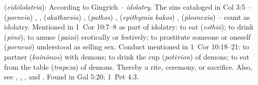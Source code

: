 \item[Idolatry,]

(\textit{eidōlolatria}):
According to Gingrich -- \emph{idolatry}. The sins cataloged in Col 3:5 --  (\emph{porneia}) , , (\emph{akatharsia}) ,  (\emph{pathos}) ,  (\emph{epithymia kakos}) ,  (\emph{pleonexia})  -- count as idolatry. Mentioned in 1~Cor 10:7--8 as part of idolatry: to eat  (\emph{esthiō}); to drink  (\emph{pinō}); to amuse  (\emph{paizō}) erotically or festively; to prostitute someone or oneself  (\emph{porneuō}) understood as selling sex. Conduct mentioned in 1~Cor 10:18--21: to partner  (\emph{koinōnos}) with demons; to drink the cup  (\emph{potērion}) of demons; to eat from the table  (\emph{trapeza}) of demons. Thereby a rite, ceremony, or sacrifice. Also, see  , , , and .
Found in Gal 5:20; 1~Pet 4:3.
